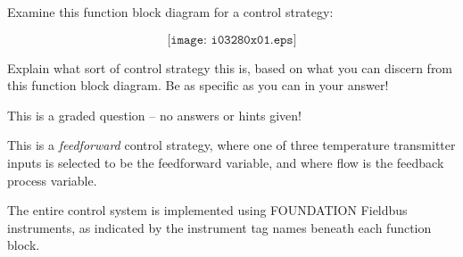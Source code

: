 

Examine this function block diagram for a control strategy:

$$\texttt{[image: i03280x01.eps]}$$

Explain what sort of control strategy this is, based on what you can discern from this function block diagram.  Be as specific as you can in your answer!

\vfil 

\eject






This is a graded question -- no answers or hints given!







This is a {\it feedforward} control strategy, where one of three temperature transmitter inputs is selected to be the feedforward variable, and where flow is the feedback process variable.  

\vskip 10pt

The entire control system is implemented using FOUNDATION Fieldbus instruments, as indicated by the instrument tag names beneath each function block.



